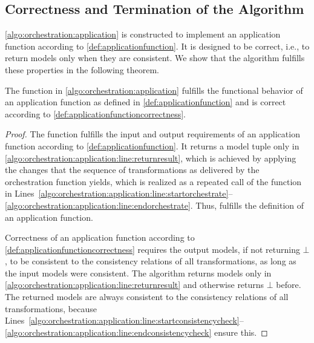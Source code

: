 \subsection{Correctness and Termination of the Algorithm}
\label{chap:orchestration:decidability:correctness_termination}

\autoref{algo:orchestration:application} is constructed to implement an application function according to \autoref{def:applicationfunction}.
It is designed to be correct, i.e., to return models only when they are consistent.
We show that the algorithm fulfills these properties in the following theorem.

\begin{theorem}
    The  function in \autoref{algo:orchestration:application} fulfills the functional behavior of an application function as defined in \autoref{def:applicationfunction} and is correct according to \autoref{def:applicationfunctioncorrectness}.
\end{theorem}

\begin{proof}
    The  function fulfills the input and output requirements of an application function according to \autoref{def:applicationfunction}.
    It returns a model tuple only in \autoref{algo:orchestration:application:line:returnresult}, which is achieved by applying the changes that the sequence of transformations as delivered by the orchestration function yields, which is realized as a repeated call of the  function in Lines~\ref{algo:orchestration:application:line:startorchestrate}--\ref{algo:orchestration:application:line:endorchestrate}.
    Thus,  fulfills the definition of an application function.

    Correctness of an application function according to \autoref{def:applicationfunctioncorrectness} requires the output models, if not returning $\bot$, to be consistent to the consistency relations of all transformations, as long as the input models were consistent.
    The algorithm returns models only in \autoref{algo:orchestration:application:line:returnresult} and otherwise returns $\bot$ before.
    The returned models are always consistent to the consistency relations of all transformations, because Lines~\ref{algo:orchestration:application:line:startconsistencycheck}--\ref{algo:orchestration:application:line:endconsistencycheck} ensure this.
\end{proof}

